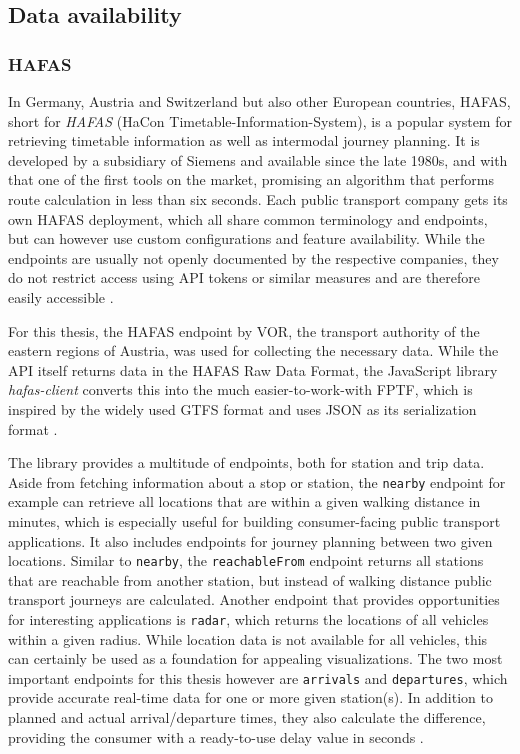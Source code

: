 \subsection{Data availability}

\subsubsection{\acf{HAFAS}}

In Germany, Austria and Switzerland but also other European countries, \acs{HAFAS}, short for \textit{\acl{HAFAS}} (HaCon Timetable-Information-System), is a popular system for retrieving timetable information as well as intermodal journey planning. It is developed by a subsidiary of Siemens and available since the late 1980s, and with that one of the first tools on the market, promising an algorithm that performs route calculation in less than six seconds. Each public transport company gets its own \ac{HAFAS} deployment, which all share common terminology and endpoints, but can however use custom configurations and feature availability. While the endpoints are usually not openly documented by the respective companies, they do not restrict access using \ac{API} tokens or similar measures and are therefore easily accessible \autocites{computerwoche-1988}{redmann-2023b}.

For this thesis, the  \ac{HAFAS} endpoint by \ac{VOR}, the transport authority of the eastern regions of Austria, was used for collecting the necessary data. While the \ac{API} itself returns data in the  \ac{HAFAS} Raw Data Format, the JavaScript library \textit{hafas-client} converts this into the much easier-to-work-with \ac{FPTF}, which is inspired by the widely used \ac{GTFS} format and uses \ac{JSON} as its serialization format \autocite{redmann-2023a}.

The library provides a multitude of endpoints, both for station and trip data. Aside from fetching information about a stop or station, the \texttt{nearby} endpoint for example can retrieve all locations that are within a given walking distance in minutes, which is especially useful for building consumer-facing public transport applications. It also includes endpoints for journey planning between two given locations. Similar to \texttt{nearby}, the \texttt{reachableFrom} endpoint returns all stations that are reachable from another station, but instead of walking distance public transport journeys are calculated. Another endpoint that provides opportunities for interesting applications is \texttt{radar}, which returns the locations of all vehicles within a given radius. While location data is not available for all vehicles, this can certainly be used as a foundation for appealing visualizations. The two most important endpoints for this thesis however are \texttt{arrivals} and \texttt{departures}, which provide accurate real-time data for one or more given station(s). In addition to planned and actual arrival/departure times, they also calculate the difference, providing the consumer with a ready-to-use delay value in seconds \autocites{redmann-2023a}{redmann-2023c}.

